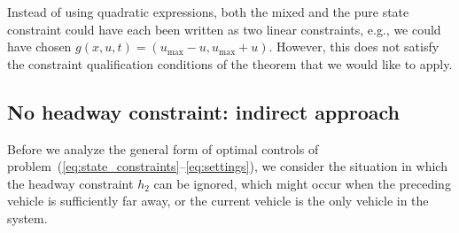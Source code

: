 \documentclass[a4paper]{article}
\theoremstyle{definition}
\theoremstyle{plain}
\begin{document}
%
Instead of using quadratic expressions, both the mixed and the pure state
constraint could have each been written as two linear constraints, e.g., we
could have chosen $g(x, u, t) = (u_{\max} - u, u_{\max} + u)$. However, this does not satisfy
the constraint qualification conditions of the theorem that we would like to
apply.

\subsection{No headway constraint: indirect approach}

Before we analyze the general form of optimal controls of
problem~(\ref{eq:state_constraints}--\ref{eq:settings}), we consider the
situation in which the headway constraint $h_{2}$ can be ignored, which might
occur when the preceding vehicle is sufficiently far away, or the current
vehicle is the only vehicle in the system.
\end{document}
